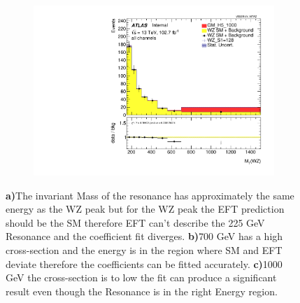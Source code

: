 \documentclass[../Bachelorarbeit.tex]{subfiles}
\begin{document}
\begin{figure}[h]
\begin{subfigure}{0.3\textwidth}
        \caption{}
    \end{subfigure}
    \begin{subfigure}{0.3\textwidth}
        \includegraphics[width=\textwidth]{Plots/operators/all_VV_MTWZ_1000.pdf}
        \caption{}
    \end{subfigure}
    \caption{\textbf{a)}The invariant Mass of the resonance has approximately the same energy as the WZ peak but for the WZ peak the EFT prediction
        should be the SM therefore EFT can't describe the 225 GeV Resonance and the coefficient fit diverges.
        \textbf{b)}700 GeV has a high cross-section and the energy is in the region where SM and EFT deviate therefore the coefficients can be fitted accurately.
        \textbf{c)}1000 GeV the cross-section is to low the fit can produce a significant result even though the Resonance is in the right Energy region.}
    \label{fig:S1_with_fit_diffrence_225}
\end{figure}
\end{document}
